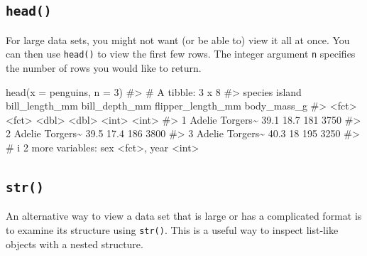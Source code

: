 \documentclass[
  letterpaper,
  DIV=11,
  numbers=noendperiod]{scrreprt}
\newenvironment{Shaded}{\begin{snugshade}}{\end{snugshade}}
\newcommand{\AttributeTok}[1]{\textcolor[rgb]{0.40,0.45,0.13}{#1}}
\newcommand{\CommentTok}[1]{\textcolor[rgb]{0.37,0.37,0.37}{#1}}
\newcommand{\DecValTok}[1]{\textcolor[rgb]{0.68,0.00,0.00}{#1}}
\newcommand{\FunctionTok}[1]{\textcolor[rgb]{0.28,0.35,0.67}{#1}}
\newcommand{\NormalTok}[1]{\textcolor[rgb]{0.00,0.23,0.31}{#1}}
\begin{document}
\subsection{\texorpdfstring{\texttt{head()}}{head()}}\label{head}

For large data sets, you might not want (or be able to) view it all at
once. You can then use \texttt{head()} to view the first few rows. The
integer argument \texttt{n} specifies the number of rows you would like
to return.

\begin{Shaded}
\begin{Highlighting}[]
\FunctionTok{head}\NormalTok{(}\AttributeTok{x =}\NormalTok{ penguins, }\AttributeTok{n =} \DecValTok{3}\NormalTok{)}
\CommentTok{\#\textgreater{} \# A tibble: 3 x 8}
\CommentTok{\#\textgreater{}   species island   bill\_length\_mm bill\_depth\_mm flipper\_length\_mm body\_mass\_g}
\CommentTok{\#\textgreater{}   \textless{}fct\textgreater{}   \textless{}fct\textgreater{}             \textless{}dbl\textgreater{}         \textless{}dbl\textgreater{}             \textless{}int\textgreater{}       \textless{}int\textgreater{}}
\CommentTok{\#\textgreater{} 1 Adelie  Torgers\textasciitilde{}           39.1          18.7               181        3750}
\CommentTok{\#\textgreater{} 2 Adelie  Torgers\textasciitilde{}           39.5          17.4               186        3800}
\CommentTok{\#\textgreater{} 3 Adelie  Torgers\textasciitilde{}           40.3          18                 195        3250}
\CommentTok{\#\textgreater{} \# i 2 more variables: sex \textless{}fct\textgreater{}, year \textless{}int\textgreater{}}
\end{Highlighting}
\end{Shaded}

\subsection{\texorpdfstring{\texttt{str()}}{str()}}\label{str}

An alternative way to view a data set that is large or has a complicated
format is to examine its structure using \texttt{str()}. This is a
useful way to inspect list-like objects with a nested structure.
\end{document}
